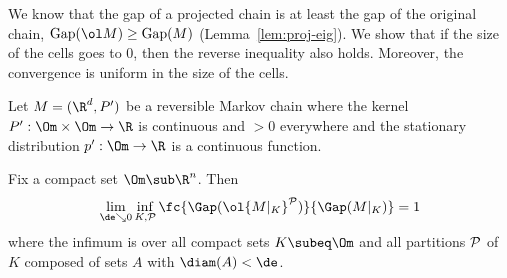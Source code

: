 We know that the gap of a projected chain is at least the gap of the original chain, $\text{Gap}(\ol M)\ge \text{Gap}(M)$ (Lemma~\ref{lem:proj-eig}). We show that if the size of the cells goes to 0, then the reverse inequality also holds. Moreover, the convergence is uniform in the size of the cells.
\begin{lem}\label{lem:limit-chain}\label{l:uniform_convergence}
Let $M=(\R^d, P')$ be a reversible Markov chain where
the kernel $P':\Om\times \Om\to \R$ is continuous and $>0$ everywhere
and the stationary distribution $p':\Om\to \R$ is a continuous function.

Fix a compact set $\Om\sub \R^n$. 
Then 
$$
\lim_{\de\searrow 0}\inf_{K, \cal P} \fc{\Gap(\ol{M|_K}^{\cal P})}{\Gap(M|_K)} = 1
$$
where the infimum is over all compact sets $K\subeq \Om$ and all partitions $\cal P$ of $K$ composed of sets $A$ with $\diam(A)<\de$. 
\end{lem}
